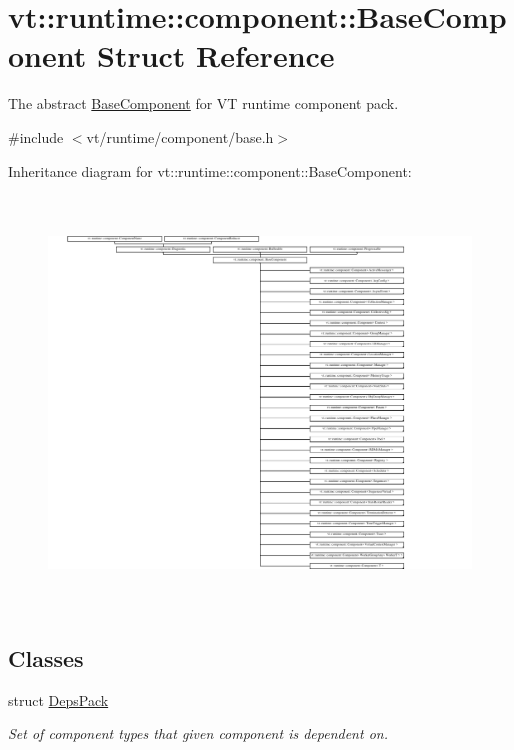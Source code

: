 \hypertarget{structvt_1_1runtime_1_1component_1_1_base_component}{}\section{vt\+:\+:runtime\+:\+:component\+:\+:Base\+Component Struct Reference}
\label{structvt_1_1runtime_1_1component_1_1_base_component}


The abstract {\ttfamily \hyperlink{structvt_1_1runtime_1_1component_1_1_base_component}{Base\+Component}} for VT runtime component pack.  




{\ttfamily \#include $<$vt/runtime/component/base.\+h$>$}

Inheritance diagram for vt\+:\+:runtime\+:\+:component\+:\+:Base\+Component\+:\begin{figure}[H]
\begin{center}
\leavevmode
\includegraphics[height=10.980392cm]{structvt_1_1runtime_1_1component_1_1_base_component}
\end{center}
\end{figure}
\subsection*{Classes}
\begin{DoxyCompactItemize}
\item 
struct \hyperlink{structvt_1_1runtime_1_1component_1_1_base_component_1_1_deps_pack}{Deps\+Pack}
\begin{DoxyCompactList}\small\item\em Set of component types that given component is dependent on. \end{DoxyCompactList}\end{DoxyCompactItemize}
